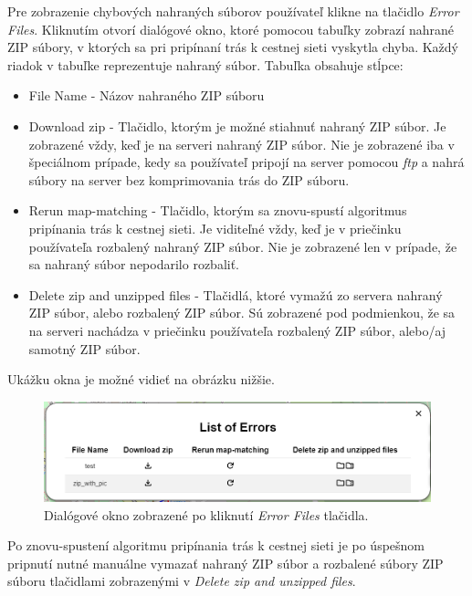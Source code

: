 Pre zobrazenie chybových nahraných súborov používateľ klikne na tlačidlo \textit{Error Files}. Kliknutím otvorí dialógové okno, ktoré pomocou tabuľky zobrazí nahrané ZIP súbory, v ktorých sa pri pripínaní trás k cestnej sieti vyskytla chyba. Každý riadok v tabuľke reprezentuje nahraný súbor. Tabuľka obsahuje stĺpce:
\begin{itemize}
  \item File Name - Názov nahraného ZIP súboru
  \item Download zip - Tlačidlo, ktorým je možné stiahnuť nahraný ZIP súbor. Je zobrazené vždy, keď je na serveri nahraný ZIP súbor. Nie je zobrazené iba v špeciálnom prípade, kedy sa používateľ pripojí na server pomocou \textit{\acrshort{ftp}} a nahrá súbory na server bez komprimovania trás do ZIP súboru.
  \item Rerun map-matching - Tlačidlo, ktorým sa znovu-spustí algoritmus pripínania trás k cestnej sieti. Je viditeľné vždy, keď je v priečinku používateľa rozbalený nahraný ZIP súbor. Nie je zobrazené len v prípade, že sa nahraný súbor nepodarilo rozbaliť.
  \item Delete zip and unzipped files - Tlačidlá, ktoré vymažú zo servera nahraný ZIP súbor, alebo rozbalený ZIP súbor. Sú zobrazené pod podmienkou, že sa na serveri nachádza v priečinku používateľa rozbalený ZIP súbor, alebo/aj samotný ZIP súbor.
\end{itemize}
Ukážku okna je možné vidieť na obrázku nižšie.
\begin{figure}[H]
  \centering
  \includegraphics[width=1 \textwidth]{img/tools-panel/errors-dialog.png}
  \caption{Dialógové okno zobrazené po kliknutí \textit{Error Files} tlačidla.}
\end{figure}
\noindent Po znovu-spustení algoritmu pripínania trás k cestnej sieti je po úspešnom pripnutí nutné manuálne vymazať nahraný ZIP súbor a rozbalené súbory ZIP súboru tlačidlami zobrazenými v \textit{Delete zip and unzipped files}.
